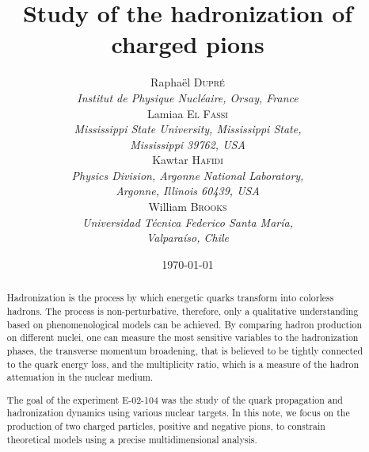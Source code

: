 \documentclass[a4paper,12pt,twoside]{article}
\title{Study of the hadronization of charged pions}
\author{
  Rapha\"el \textsc{Dupr\'e} \\ 
  {\it Institut de Physique Nucl\'eaire, Orsay, France} \\
  Lamiaa \textsc{El Fassi} \\ 
  {\it Mississippi State University, Mississippi State,} \\ 
  {\it Mississippi 39762, USA} \\
  Kawtar \textsc{Hafidi} \\ 
  {\it Physics Division, Argonne National Laboratory,} \\ 
  {\it Argonne, Illinois 60439, USA} \\
  William \textsc{Brooks} \\
  {\it Universidad T\'ecnica Federico Santa Mar\'ia,} \\ 
  {\it Valpara\'iso, Chile} 
}
\date{\today}
\begin{document}
\maketitle

\renewcommand{\baselinestretch}{1.10}

\begin{abstract}
Hadronization is the process by which energetic quarks transform into colorless hadrons. The process is non-perturbative, therefore, only a qualitative understanding based on phenomenological models can be achieved. By comparing hadron production on different nuclei, one can measure the most sensitive variables to the hadronization phases, the transverse momentum broadening, that is believed to be tightly connected to the quark energy loss, and the multiplicity ratio, which is a measure of the hadron attenuation in the nuclear medium.

The goal of the experiment E-02-104 was the study of the quark propagation and hadronization dynamics using various nuclear targets. In this note, we focus on the production of two charged particles, positive and negative pions, to constrain theoretical models using a precise multidimensional analysis.

\end{abstract}

\newpage

\tableofcontents

\newpage









\end{document}

